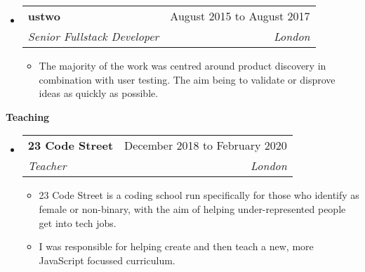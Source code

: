 \documentclass[letterpaper,12pt]{article}[leftmargin=*]
\makeatletter
\def \entryspacing {-0pt}
\renewcommand{\section}[2]{\vspace{5pt}
  \colorbox{secondary}{\color{white}\raggedbottom\normalsize{#1}{\hspace{7pt}\textbf{#2}}}
}
\newenvironment{resumeEntry}[0]{
  \begin{itemize}[leftmargin=2.5mm]
  }{
  \end{itemize}\vspace{\entryspacing}
}
\newenvironment{resumeItemList}[0]{
  \begin{itemize}[leftmargin=4.5mm]
  }{
  \end{itemize}
}
\newcommand{\resumeItem}[1]{
  \item\small{
    {#1 \vspace{-2pt}}
  }
}
\newcommand{\resumeEntryTSDL}[4]{
  \vspace{-1pt}\item[]
    \begin{tabularx}{0.97\textwidth}{X@{\hspace{60pt}}r}
      \textbf{\color{primary}#1} & {\firabook\color{accent}\small#2} \\
      \textit{\color{accent}\small#3} & \textit{\color{accent}\small#4} \\
    \end{tabularx}\vspace{-6pt}
}
\makeatother
\begin{document}
  \begin{resumeEntry}
    \resumeEntryTSDL{ustwo}{August 2015 to August 2017}{Senior Fullstack Developer}{London}
    \begin{resumeItemList}
      \resumeItem{The majority of the work was centred around product discovery in combination with user testing. The aim being to validate or disprove ideas as quickly as possible.}
    \end{resumeItemList}
  \end{resumeEntry}




\section{\faGraduationCap}{Teaching}

  \begin{resumeEntry}
    \resumeEntryTSDL{23 Code Street}{December 2018 to February 2020}{Teacher}{London}
    \begin{resumeItemList}
      \resumeItem{23 Code Street is a coding school run specifically for those who identify as female or non-binary, with the aim of helping under-represented people get into tech jobs.}
      \resumeItem{I was responsible for helping create and then teach a new, more JavaScript focussed curriculum.}
    \end{resumeItemList}
  \end{resumeEntry}
\end{document}
